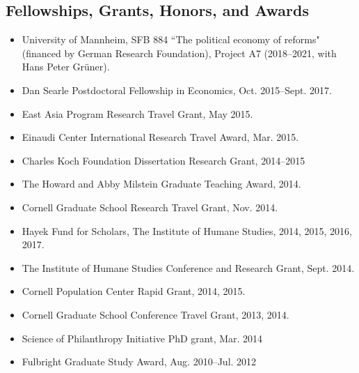 \documentclass[margin, a4paper]{res}
\begin{document}
\begin{resume}
\section{Fellowships, Grants, Honors, and Awards}
\begin{itemize}[leftmargin=*]
\item University of Mannheim, SFB 884 ``The political economy of reforms" (financed by German Research Foundation), Project A7 (2018--2021, with Hans Peter Gr{\"u}ner).
\item Dan Searle Postdoctoral Fellowship in Economics, Oct. 2015--Sept. 2017.
\item East Asia Program Research Travel Grant, May 2015.
\item Einaudi Center International Research Travel Award, Mar. 2015.
\item Charles Koch Foundation Dissertation Research Grant, 2014--2015
\item The Howard and Abby Milstein Graduate Teaching Award, 2014.
\item Cornell Graduate School Research Travel Grant, Nov. 2014.
\item Hayek Fund for Scholars, The Institute of Humane Studies, 2014, 2015, 2016, 2017.
\item The Institute of Humane Studies Conference and Research Grant, Sept. 2014.
\item Cornell Population Center Rapid Grant, 2014, 2015.
\item Cornell Graduate School Conference Travel Grant, 2013, 2014.
\item Science of Philanthropy Initiative PhD grant, Mar. 2014
\item Fulbright Graduate Study Award, Aug. 2010--Jul. 2012
\end{itemize}


\end{resume}
\end{document}
